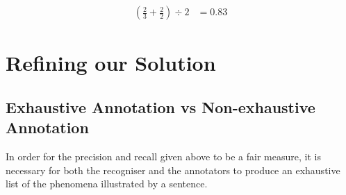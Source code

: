 \documentclass[11pt]{article}
\begin{document}
 \begin{align*}
            (\frac{2}{3} + \frac{2}{2})\div 2 &= 0.83
\end{align*}


\section{Refining our Solution}

\subsection{Exhaustive Annotation vs Non-exhaustive Annotation}
In order for the precision and recall given above to be a fair measure, it is necessary for both the recogniser and the annotators to produce an exhaustive list of the phenomena illustrated by a sentence. %
%


%
    
\end{document}
